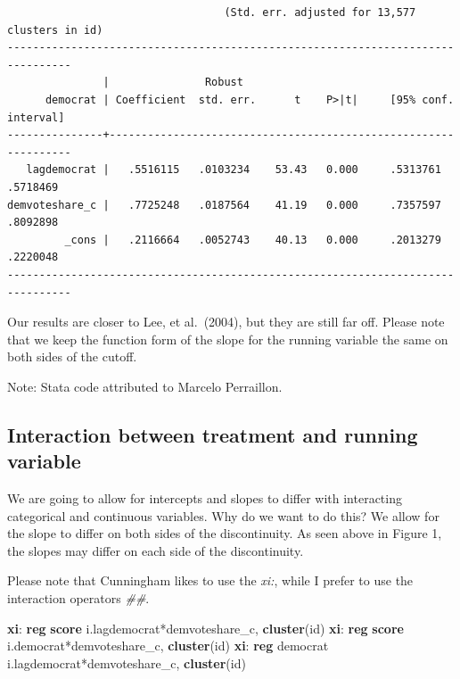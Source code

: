 \documentclass[
]{book}
\newenvironment{Shaded}{\begin{snugshade}}{\end{snugshade}}
\newcommand{\KeywordTok}[1]{\textcolor[rgb]{0.13,0.29,0.53}{\textbf{#1}}}
\newcommand{\NormalTok}[1]{#1}
\begin{document}
\begin{verbatim}
                                  (Std. err. adjusted for 13,577 clusters in id)
--------------------------------------------------------------------------------
               |               Robust
      democrat | Coefficient  std. err.      t    P>|t|     [95% conf. interval]
---------------+----------------------------------------------------------------
   lagdemocrat |   .5516115   .0103234    53.43   0.000     .5313761    .5718469
demvoteshare_c |   .7725248   .0187564    41.19   0.000     .7357597    .8092898
         _cons |   .2116664   .0052743    40.13   0.000     .2013279    .2220048
--------------------------------------------------------------------------------
\end{verbatim}

Our results are closer to Lee, et al.~(2004), but they are still far off. Please note that we keep the function form of the slope for the running variable the same on both sides of the cutoff.

Note: Stata code attributed to Marcelo Perraillon.

\subsection{Interaction between treatment and running variable}\label{interaction-between-treatment-and-running-variable}

We are going to allow for intercepts and slopes to differ with interacting categorical and continuous variables. Why do we want to do this? We allow for the slope to differ on both sides of the discontinuity. As seen above in Figure 1, the slopes may differ on each side of the discontinuity.

Please note that Cunningham likes to use the \emph{xi:}, while I prefer to use the interaction operators \emph{\#\#}.

\begin{Shaded}
\begin{Highlighting}[]
\KeywordTok{xi}\NormalTok{: }\KeywordTok{reg} \KeywordTok{score}\NormalTok{ i.lagdemocrat*demvoteshare\_c, }\KeywordTok{cluster}\NormalTok{(id)}
\KeywordTok{xi}\NormalTok{: }\KeywordTok{reg} \KeywordTok{score}\NormalTok{ i.democrat*demvoteshare\_c, }\KeywordTok{cluster}\NormalTok{(id)}
\KeywordTok{xi}\NormalTok{: }\KeywordTok{reg}\NormalTok{ democrat i.lagdemocrat*demvoteshare\_c, }\KeywordTok{cluster}\NormalTok{(id)}
\end{Highlighting}
\end{Shaded}
\end{document}
